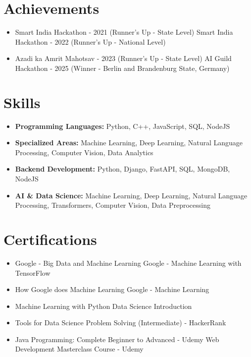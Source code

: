 \documentclass[a4paper,10pt]{article}
\begin{document}
\section*{Achievements}
\begin{itemize}
\item Smart India Hackathon - 2021 (Runner's Up - State Level) \hfill Smart India Hackathon - 2022 (Runner's Up - National Level)
\item Azadi ka Amrit Mahotsav - 2023 (Runner's Up - State Level) \hfill AI Guild Hackathon - 2025 (Winner - Berlin and Brandenburg State, Germany)
\end{itemize}

\section*{Skills}
\begin{itemize}
  \item \textbf{Programming Languages:} Python, C++, JavaScript, SQL, NodeJS
  \item \textbf{Specialized Areas:} Machine Learning, Deep Learning, Natural Language Processing, Computer Vision, Data Analytics
  \item \textbf{Backend Development:} Python, Django, FastAPI, SQL, MongoDB, NodeJS
  \item \textbf{AI \& Data Science:} Machine Learning, Deep Learning, Natural Language Processing, Transformers, Computer Vision, Data Preprocessing
\end{itemize}

\section*{Certifications}
\begin{itemize}
\item Google - Big Data and Machine Learning \hfill Google - Machine Learning with TensorFlow
\item How Google does Machine Learning \hfill Google - Machine Learning
\item Machine Learning with Python \hfill Data Science Introduction
\item Tools for Data Science \hfill Problem Solving (Intermediate) - HackerRank
\item Java Programming: Complete Beginner to Advanced - Udemy \hfill Web Development Masterclass Course - Udemy
\end{itemize}
\end{document}
